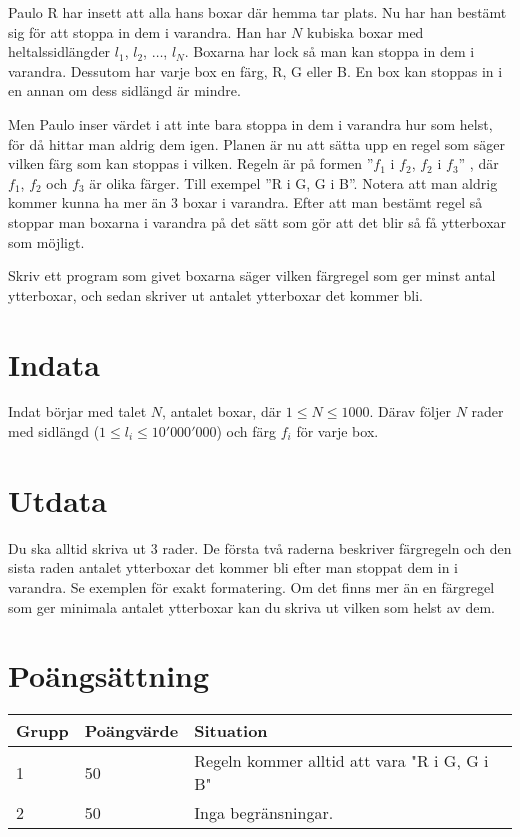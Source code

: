 
Paulo R har insett att alla hans boxar där hemma tar plats. Nu har han bestämt
sig för att stoppa in dem i varandra. Han har $N$ kubiska boxar med
heltalssidlängder $l_1$, $l_2$, $\ldots$, $l_N$. Boxarna har lock så man kan stoppa in
dem i varandra. Dessutom har varje box en färg, R, G eller B. 
En box kan stoppas in i en annan om dess sidlängd är mindre.

Men Paulo inser värdet i att inte bara stoppa in dem i varandra hur som helst,
för då hittar man aldrig dem igen.
Planen är nu att sätta upp en regel som säger vilken färg som kan stoppas i
vilken. Regeln är på formen ''$f_1$ i $f_2$, $f_2$ i $f_3$'' , 
där $f_1$, $f_2$ och $f_3$ är olika färger. Till exempel ''R i
G, G i B''. Notera att man aldrig kommer kunna ha mer än 3 boxar i
varandra. Efter att man bestämt regel så stoppar man boxarna i varandra på det sätt
som gör att det blir så få ytterboxar som möjligt.

Skriv ett program som givet boxarna säger vilken färgregel som ger minst antal
ytterboxar, och sedan skriver ut antalet ytterboxar det kommer bli.

\section*{Indata}

Indat börjar med talet $N$, antalet boxar, där $1\le N \le 1000$. Därav följer $N$ rader med sidlängd
($1 \le l_i \le 10'000'000$) och färg $f_i$ för varje box.

\section*{Utdata}

Du ska alltid skriva ut 3 rader. De första två raderna beskriver färgregeln
och den sista raden antalet ytterboxar det kommer bli efter man stoppat dem in i
varandra. Se exemplen för exakt formatering. Om det finns mer än en färgregel 
som ger minimala antalet ytterboxar kan du skriva ut vilken som helst av dem.

\section*{Poängsättning}

\begin{tabular}{| l | l | l |}
\hline
Grupp & Poängvärde & Situation \\ \hline
1     & 50         & Regeln kommer alltid att vara "R i G, G i B" \\ \hline
2     & 50         & Inga begränsningar. \\ \hline
\end{tabular}
